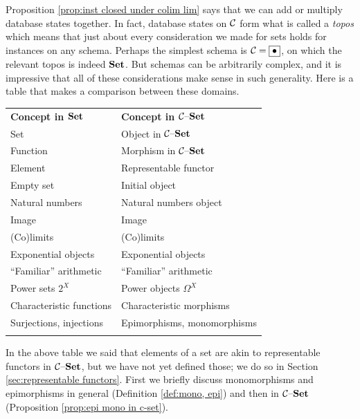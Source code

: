 \documentclass[CT4S-EN-RU]{subfiles}
\begin{document}
\begin{exerciseRUS}\label{exc:universal objects in C-set}
\end{exerciseRUS}

\begin{blockENG}
Proposition \ref{prop:inst closed under colim lim} says that we can add or multiply database states together. In fact, database states on $\mathcal{C}$ form what is called a {\em topos} which means that just about every consideration we made for sets holds for instances on any schema. Perhaps the simplest schema is $\mathcal{C}=\fbox{$\bullet$}$, on which the relevant topos is indeed $\Set$. But schemas can be arbitrarily complex, and it is impressive that all of these considerations make sense in such generality. Here is a table that makes a comparison between these domains.
\begin{center}
\begin{tabular}{| l | l |}\bhline
\multicolumn{2}{| c |}{Dictionary between $\Set$ and $\mcC\set$}\\\hline
{\bf Concept in $\Set$}&{\bf Concept in $\mcC\set$}\\\bbhline
Set & Object in $\mcC\set$\\\hline
Function & Morphism in $\mcC\set$\\\hline
Element&Representable functor\\\hline
Empty set & Initial object\\\hline
Natural numbers&Natural numbers object\\\hline
Image&Image\\\hline
(Co)limits&(Co)limits\\\hline
Exponential objects&Exponential objects\\\hline
“Familiar” arithmetic&“Familiar” arithmetic\\\hline
Power sets $2^X$&Power objects $\Omega^X$\\\hline
Characteristic functions&Characteristic morphisms\\\hline
Surjections, injections&Epimorphisms, monomorphisms\\\bhline
\end{tabular}
\end{center}
\end{blockENG}

\begin{blockRUS}
\end{blockRUS}

\begin{blockENG}
In the above table we said that elements of a set are akin to representable functors in $\mcC\set$, but we have not yet defined those; we do so in Section \ref{sec:representable functors}. First we briefly discuss monomorphisms and epimorphisms in general (Definition \ref{def:mono, epi}) and then in $\mcC\set$ (Proposition \ref{prop:epi mono in c-set}). 
\end{blockENG}
\end{document}
